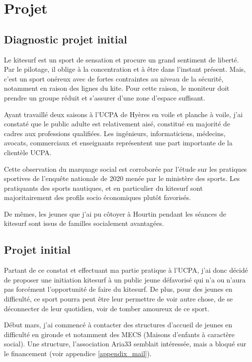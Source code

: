 \documentclass[11pt,a4paper]{report}
\begin{document}
\FloatBarrier
\section{Projet}
\subsection{Diagnostic projet initial}

Le kitesurf est un sport de sensation et procure un grand
sentiment de liberté. Par le pilotage, il oblige à 
la concentration et à \^etre dans l'instant présent.
Mais, c'est un sport onéreux avec de fortes contraintes
au niveau de la sécurité, notamment en raison des lignes du kite.
Pour cette raison, le moniteur doit prendre un groupe réduit
et s'assurer d'une zone  d'espace suffisant. 

Ayant travaillé deux saisons  à l'UCPA de Hyères en voile
et planche à voile, j'ai  constaté que le public adulte est relativement
aisé, constitué en majorité de cadres aux professions qualifiées. Les
ingénieurs, informaticiens, médecins, avocats, commerciaux et enseignants
représentent une part importante de la clientèle UCPA.

Cette observation du marquage social  est corroborée par l'étude sur 
les pratiques sportives de l'enqu\^ete nationale de
2020 menée par le ministère des sports\cite{injep}. Les pratiquants
des sports nautiques, et en particulier du kitesurf sont majoritairement
des profils socio économiques plut\^ot favorisés.

De m\^emes, les jeunes que j'ai pu côtoyer à Hourtin
pendant les séances de kitesurf sont  issus de
familles socialement avantagées.

\subsection{Projet initial}
Partant de ce constat et effectuant ma partie pratique à l'UCPA,
j'ai donc décidé de proposer une initiation kitesurf à un public jeune
défavorisé qui n'a ou n'aura pas forcément l'opportunité de faire du kitesurf. 
De plus, pour des jeunes en difficulté, ce sport pourra peut être 
leur permettre de voir autre chose, de se déconnecter de leur quotidien,
voir de tomber amoureux de ce sport.

Début mars, j'ai commencé à contacter des structures d'accueil de jeunes 
en difficulté en gironde et notamment des MECS (Maisons d'enfants à
caractère social).
Une structure, l'association Aria33\cite{aria33} semblait 
intéressée, mais a bloqué sur le financement
(voir appendice \ref{appendix_mail}).
\end{document}

